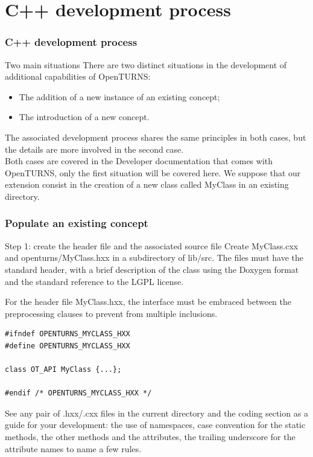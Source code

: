 \documentclass[8pt]{beamer}
\begin{document}
\section[C++ development process]{C++ development process}
\begin{frame}
  \frametitle{C++ development process}
  \begin{block}{Two main situations}
    There are two distinct situations in the development of additional capabilities of OpenTURNS:
    \begin{itemize}
      \item The addition of a new instance of an existing concept;
      \item The introduction of a new concept.
    \end{itemize}
    The associated development process shares the same principles in both cases, but the details are more involved in the second case.\\
    Both cases are covered in the \alert{Developer} documentation that comes with OpenTURNS, only the first situation will be covered here. We suppose that our extension consist in the creation of a new class called MyClass in an existing directory.
  \end{block}
\end{frame}
\begin{frame}[fragile]
  \frametitle{Populate an existing concept}
  \begin{block}{Step 1: create the header file and the associated source file}
    Create MyClass.cxx and openturns/MyClass.hxx in a subdirectory of lib/src. The files must have the standard header,
    with a brief description of the class using the Doxygen format and the standard reference to the LGPL license.
  
  For the header file MyClass.hxx, the interface must be embraced between the preprocessing clauses to prevent from multiple inclusions.

\begin{lstlisting}
#ifndef OPENTURNS_MYCLASS_HXX
#define OPENTURNS_MYCLASS_HXX

class OT_API MyClass {...};

#endif /* OPENTURNS_MYCLASS_HXX */
\end{lstlisting}

  See any pair of .hxx/.cxx files in the current directory and the coding section as a guide for your development: the use of namespaces, case convention for the static methods, the other methods and the attributes, the trailing underscore for the attribute names to name a few rules.
  \end{block}
\end{frame}
\end{document}
